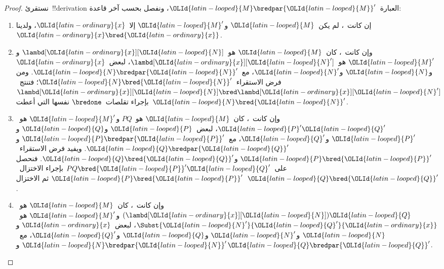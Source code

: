 \documentclass[../../../include/open-logic-section]{subfiles}
\begin{document}
\begin{proof}
  نستقرئ~!!{derivation} العبارة~${\OLId{latin-looped}{M}} \bredpar {\OLId{latin-looped}{M}}'$، ونفصل بحسب آخر قاعدة:
  \begin{enumerate}
  \item إن كانت~، لم يكن~${\OLId{latin-looped}{M}}$ و${\OLId{latin-looped}{M}}'$ إلا~${\OLId{latin-ordinary}{x}}$،
    ولدينا~${\OLId{latin-ordinary}{x}} \bred {\OLId{latin-ordinary}{x}}$.
  \item وإن كانت~، كان~${\OLId{latin-looped}{M}}$ هو~$\lambd[{\OLId{latin-ordinary}{x}}][{\OLId{latin-looped}{N}}]$
    و${\OLId{latin-looped}{M}}'$ هو~$\lambd[{\OLId{latin-ordinary}{x}}][{\OLId{latin-looped}{N}}']$، لبعض~${\OLId{latin-ordinary}{x}}$ و${\OLId{latin-looped}{N}}$ و${\OLId{latin-looped}{N}}'$، مع~${\OLId{latin-looped}{N}} \bredpar {\OLId{latin-looped}{N}}'$.
    ومن فرض الاستقراء~${\OLId{latin-looped}{N}} \bred {\OLId{latin-looped}{N}}'$؛ فتنتج~$\lambd[{\OLId{latin-ordinary}{x}}][{\OLId{latin-looped}{N}}] \bred \lambd[{\OLId{latin-ordinary}{x}}][{\OLId{latin-looped}{N}}']$
    بإجراء تقلصات~$\bredone$ نفسها التي أعطت~${\OLId{latin-looped}{N}} \bred {\OLId{latin-looped}{N}}'$.
  \item وإن كانت~، كان~${\OLId{latin-looped}{M}}$ هو~$PQ$ و${\OLId{latin-looped}{M}}'$ هو~${\OLId{latin-looped}{P}}'{\OLId{latin-looped}{Q}}'$،
    لبعض~${\OLId{latin-looped}{P}}$ و${\OLId{latin-looped}{Q}}$ و${\OLId{latin-looped}{P}}'$ و${\OLId{latin-looped}{Q}}'$، مع~${\OLId{latin-looped}{P}} \bredpar {\OLId{latin-looped}{P}}'$ و${\OLId{latin-looped}{Q}} \bredpar {\OLId{latin-looped}{Q}}'$.
    ويفيد فرض الاستقراء~${\OLId{latin-looped}{P}} \bred {\OLId{latin-looped}{P}}'$ و${\OLId{latin-looped}{Q}} \bred {\OLId{latin-looped}{Q}}'$.
    فنحصل على~$PQ \bred {\OLId{latin-looped}{P}}'{\OLId{latin-looped}{Q}}'$ بإجراء الاختزال~${\OLId{latin-looped}{P}} \bred {\OLId{latin-looped}{P}}'$
    ثم الاختزال~${\OLId{latin-looped}{Q}} \bred {\OLId{latin-looped}{Q}}'$.
  \item وإن كانت~، كان~${\OLId{latin-looped}{M}}$ هو~$(\lambd[{\OLId{latin-ordinary}{x}}][{\OLId{latin-looped}{N}}]){\OLId{latin-looped}{Q}}$
    و${\OLId{latin-looped}{M}}'$ هو~$\Subst{{\OLId{latin-looped}{N}}'}{{\OLId{latin-looped}{Q}}'}{{\OLId{latin-ordinary}{x}}}$، لبعض~${\OLId{latin-ordinary}{x}}$ و${\OLId{latin-looped}{N}}$ و${\OLId{latin-looped}{N}}'$ و${\OLId{latin-looped}{Q}}$ و${\OLId{latin-looped}{Q}}'$،
    مع~${\OLId{latin-looped}{N}} \bredpar {\OLId{latin-looped}{N}}'$ و${\OLId{latin-looped}{Q}} \bredpar {\OLId{latin-looped}{Q}}'$.

\end{enumerate}
\end{proof}
\end{document}
